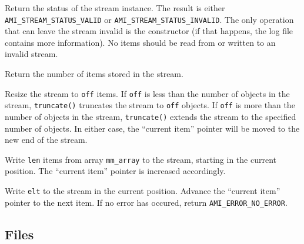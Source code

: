   \etabb
  
  \clearpage

  \btabb
     {Return the status
    of the stream instance. The result is either
    \lstinline|AMI_STREAM_STATUS_VALID| or
    \lstinline|AMI_STREAM_STATUS_INVALID|. The only operation that can
    leave the stream invalid is the constructor (if that happens, the log
    file contains more information). No items should be read from or
    written to an invalid stream.}

     {Return the number of items stored in
the stream.}

     {Resize the stream to
\lstinline|off| items. If \lstinline|off| is less than the number of objects in the
stream, \lstinline|truncate()| truncates the stream to
\lstinline|off| objects. If \lstinline|off| is more than the
number of objects in the stream, \lstinline|truncate()| extends
the stream to the specified number of objects. In either
case, the ``current item'' pointer will be moved to the new end of
the stream.}

     {Write
\lstinline|len| items from array \lstinline|mm_array| to the stream, starting in the
current position. The ``current item'' pointer is increased accordingly.}

     {Write \lstinline|elt| to the
stream in the current position. Advance the ``current item'' pointer to the
next item. If no error has occured, return \lstinline|AMI_ERROR_NO_ERROR|.}
        
  \etabb
{}



\subsection{Files}
  \btabb
     {}
  \etabb

